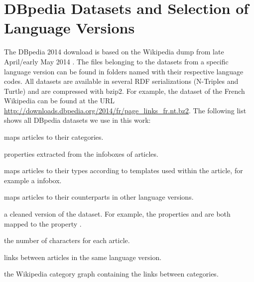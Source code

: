 \documentclass[a4paper,12pt]{scrartcl}
\begin{document}

\section{DBpedia Datasets and Selection of Language Versions}\label{sec:datasets}

The DBpedia 2014 download is based on the Wikipedia dump from late
April/early May 2014 \cite{dbpedia2014download}. %
The files belonging to the datasets from a
specific language version can be found in folders
named with their respective language codes. All
datasets are available in several RDF serializations (\eg N-Triples
and Turtle) and are compressed with bzip2.
For example, the  dataset of the French Wikipedia
can be found at the URL
\url{http://downloads.dbpedia.org/2014/fr/page_links_fr.nt.bz2}.
%
The following list shows all DBpedia datasets we use in this work:
%
\begin{description}\setlength{\itemsep}{0pt}
\item[\wpfile{article\_categories}:] maps articles to their
  categories.
\item[\wpfile{infobox\_properties}:] properties extracted
  from the infoboxes of articles.
\item[\wpfile{instance\_types}:] maps articles to their types
  according to templates used within the article, for example
  a  infobox.
\item[\wpfile{interlanguage\_links}:] maps articles to their
  counterparts in other language versions.
\item[\wpfile{mappingbased\_properties}:] a cleaned version of the
   dataset.  For example, the properties
   and  are both mapped to the
  property .
\item[\wpfile{page\_length}:] the number of characters for each
  article.
\item[\wpfile{page\_links}:] links between articles in the same
  language version.
\item[\wpfile{skos\_categories}:] the Wikipedia category graph
  containing the links between categories.
\end{description}
\end{document}
